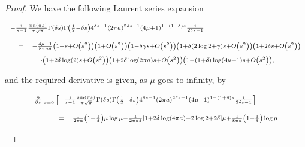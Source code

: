 \documentclass{jams-l}
\theoremstyle{definition}
\theoremstyle{remark}
\numberwithin{equation}{section}
\begin{document}
\begin{proof}
                \noindent We have the following Laurent series expansion
                
                \[ \begin{array}{lll}
                        \multicolumn{3}{l}{\scriptstyle - \frac{1}{s-1} \frac{\sin \left( \pi s \right)}{\pi \sqrt{\pi}} \Gamma \left( \delta s \right) \Gamma \left( \frac{1}{2} - \delta s \right) 4^{\delta s - 1} \left( 2 \pi a \right)^{2 \delta s - 1} \left( 4 \mu + 1 \right)^{1 - \left( 1+\delta \right) s} \frac{1}{2 \delta s - 1}} \\[1em]
                        
                        & \scriptstyle = & \scriptstyle - \frac{4 \mu + 1}{8 \pi a \delta} \left( 1 + s + O \left( s^2 \right) \right) \left( 1 + O \left( s^2 \right) \right) \left( 1 - \delta \gamma s + O \left( s^2 \right) \right) \left( 1 + \delta \left( 2 \log 2 + \gamma \right) s + O \left( s^2 \right) \right) \left( 1 + 2 \delta s + O \left( s^2 \right) \right) \\[0.5em]
                        
                        && \quad \scriptstyle \cdot \left( 1 + 2 \delta \log \left( 2 \right) s + O \left( s^2 \right) \right) \left( 1 + 2 \delta \log \left( 2 \pi a \right) s + O \left( s^2 \right) \right) \left( 1 - \left( 1+\delta \right) \log \left( 4 \mu + 1 \right) s + O \left( s^2 \right) \right), 
                    \end{array} \]
                
                \noindent and the required derivative is given, as $\mu$ goes to infinity, by
                
                \[ \begin{array}{lll}
                        \multicolumn{3}{l}{\scriptstyle \frac{\partial}{\partial s}_{\left \vert s = 0 \right.} \left[ - \frac{1}{s-1} \frac{\sin \left( \pi s \right)}{\pi \sqrt{\pi}} \Gamma \left( \delta s \right) \Gamma \left( \frac{1}{2} - \delta s \right) 4^{\delta s - 1} \left( 2 \pi a \right)^{2 \delta s - 1} \left( 4 \mu + 1 \right)^{1 - \left( 1+\delta \right) s} \frac{1}{2 \delta s - 1} \right]} \\[1em]
                        
                        \qquad & \scriptstyle = & \scriptstyle \frac{1}{2 \pi a} \left( 1 + \frac{1}{\delta} \right) \mu \log \mu - \frac{1}{2 \pi a \delta} \left[ 1 + 2 \delta \log \left( 4 \pi a \right) - 2 \log 2 + 2 \delta \right] \mu  + \frac{1}{8 \pi a} \left( 1 + \frac{1}{\delta} \right) \log \mu \\[0.5em]
                        

\end{array}\]
\end{proof}
\end{document}
